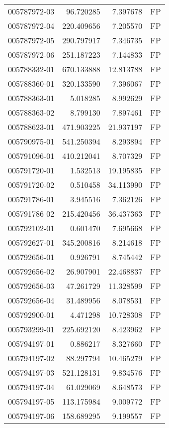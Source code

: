 \begin{tabular}{lrrl}
005787972-03 &   96.720285 &     7.397678 &   FP \\
005787972-04 &  220.409656 &     7.205570 &   FP \\
005787972-05 &  290.797917 &     7.346735 &   FP \\
005787972-06 &  251.187223 &     7.144833 &   FP \\
005788332-01 &  670.133888 &    12.813788 &   FP \\
005788360-01 &  320.133590 &     7.396067 &   FP \\
005788363-01 &    5.018285 &     8.992629 &   FP \\
005788363-02 &    8.799130 &     7.897461 &   FP \\
005788623-01 &  471.903225 &    21.937197 &   FP \\
005790975-01 &  541.250394 &     8.293894 &   FP \\
005791096-01 &  410.212041 &     8.707329 &   FP \\
005791720-01 &    1.532513 &    19.195835 &   FP \\
005791720-02 &    0.510458 &    34.113990 &   FP \\
005791786-01 &    3.945516 &     7.362126 &   FP \\
005791786-02 &  215.420456 &    36.437363 &   FP \\
005792102-01 &    0.601470 &     7.695668 &   FP \\
005792627-01 &  345.200816 &     8.214618 &   FP \\
005792656-01 &    0.926791 &     8.745442 &   FP \\
005792656-02 &   26.907901 &    22.468837 &   FP \\
005792656-03 &   47.261729 &    11.328599 &   FP \\
005792656-04 &   31.489956 &     8.078531 &   FP \\
005792900-01 &    4.471298 &    10.728308 &   FP \\
005793299-01 &  225.692120 &     8.423962 &   FP \\
005794197-01 &    0.886217 &     8.327660 &   FP \\
005794197-02 &   88.297794 &    10.465279 &   FP \\
005794197-03 &  521.128131 &     9.834576 &   FP \\
005794197-04 &   61.029069 &     8.648573 &   FP \\
005794197-05 &  113.175984 &     9.009772 &   FP \\
005794197-06 &  158.689295 &     9.199557 &   FP \\

\end{tabular}
